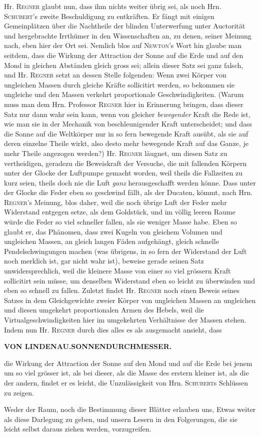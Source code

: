 Hr. \textsc{Regner} glaubt nun, dass ihm nichts weiter übrig sei, als noch Hrn. \textsc{Schubert}'s zweite Beschuldigung zu entkräften. Er fängt mit einigen Gemeinplätzen über die Nachtheile der blinden Unterwerfung unter Auctorität und hergebrachte Irrthümer in den Wissenschaften an, zu denen, seiner Meinung nach, eben hier der Ort sei. Nemlich blos auf \textsc{Newton}'s Wort hin glaube man seitdem, dass die Wirkung der Attraction der Sonne auf die Erde und auf den Mond in gleichen Abständen gleich gross sei; allein dieser Satz sei ganz falsch, und Hr. \textsc{Regner} setzt an dessen Stelle folgenden: Wenn zwei Körper von ungleichen Massen durch gleiche Kräfte sollicitirt werden, so bekommen sie ungleiche und den Massen verkehrt proportionale Geschwindigkeiten. (Warum muss man dem Hrn. Professor \textsc{Regner} hier in Erinnerung bringen, dass dieser Satz nur dann wahr sein kann, wenn von gleicher \emph{bewegender} Kraft die Rede ist, wie man sie in der Mechanik von beschleunigender Kraft unterscheidet; und dass die Sonne auf die Weltkörper nur in so fern bewegende Kraft ausübt, als sie auf deren einzelne Theile wirkt, also desto mehr bewegende Kraft auf das Ganze, je mehr Theile angezogen werden?) Hr. \textsc{Regner} läugnet, um diesen Satz zu vertheidigen, geradezu die Beweiskraft der Versuche, die mit fallenden Körpern unter der Glocke der Luftpumpe gemacht worden, weil theils die Fallzeiten zu kurz seien, theils doch nie die Luft \emph{ganz} herausgeschafft werden könne. Dass unter der Glocke die Feder eben so geschwind fällt, als der Ducaten, kömmt, nach Hrn. \textsc{Regner}'s Meinung, blos daher, weil die noch übrige Luft der Feder mehr Widerstand entgegen setze, als dem Goldstück, und im völlig leeren Raume würde die Feder so viel schneller fallen, als sie weniger Masse habe. Eben so glaubt er, das Phänomen, dass zwei Kugeln von gleichem Volumen und ungleichen Massen, an gleich langen Fäden aufgehängt, gleich schnelle Pendelschwingungen machen (was übrigens, in so fern der Widerstand der Luft noch merklich ist, gar nicht wahr ist), beweise gerade seinen Satz unwidersprechlich, weil die kleinere Masse von einer so viel grössern Kraft sollicitirt sein müsse, um denselben Widerstand eben so leicht zu überwinden und eben so schnell zu fallen. Zuletzt findet Hr. \textsc{Regner} noch einen Beweis seines Satzes in dem Gleichgewichte zweier Körper von ungleichen Massen an ungleichen und diesen umgekehrt proportionalen Armen des Hebels, weil die Virtualgeschwindigkeiten hier im umgekehrten Verhältnisse der Massen stehen. Indem nun Hr. \textsc{Regner} durch dies alles es als ausgemacht ansieht, dass\par
\clearpage
\noindent{}%
\makebox[12mm][l]{}%
\parbox[t]{\dimexpr\linewidth-24mm\relax}{\centering\footnotesize\bfseries VON LINDENAU.\enspace SONNENDURCHMESSER.\par}%
\par\nobreak\medskip
\noindent die Wirkung der Attraction der Sonne auf den Mond und auf die Erde bei jenem um so viel grösser ist, als bei dieser, als die Masse des erstern kleiner ist, als die der andern, findet er es leicht, die Unzulässigkeit von Hrn. \textsc{Schubert}s Schlüssen zu zeigen.

Weder der Raum, noch die Bestimmung dieser Blätter erlauben uns, Etwas weiter als diese Darlegung zu geben, und unsern Lesern in den Folgerungen, die sie leicht selbst daraus ziehen werden, vorzugreifen.
